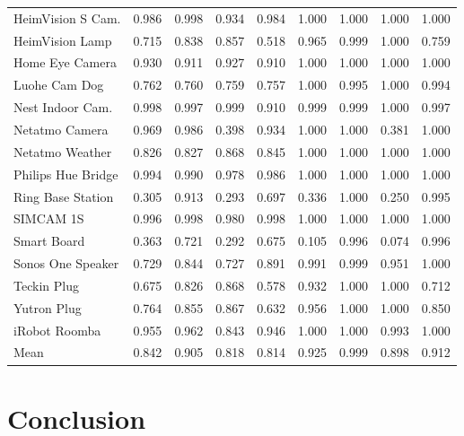 \documentclass[journal]{IEEEtran}
\begin{document}
\begin{table}[htbp]
\begin{tabular}{@{}lrrrrrrrr@{}}
		HeimVision S Cam. & 0.986 & 0.998 & 0.934 & 0.984 & 1.000 & 1.000 & 1.000 & 1.000 \\
		HeimVision Lamp & 0.715 & 0.838 & 0.857 & 0.518 & 0.965 & 0.999 & 1.000 & 0.759 \\
		Home Eye Camera & 0.930 & 0.911 & 0.927 & 0.910 & 1.000 & 1.000 & 1.000 & 1.000 \\
		Luohe Cam Dog & 0.762 & 0.760 & 0.759 & 0.757 & 1.000 & 0.995 & 1.000 & 0.994 \\
		Nest Indoor Cam. & 0.998 & 0.997 & 0.999 & 0.910 & 0.999 & 0.999 & 1.000 & 0.997 \\
		Netatmo Camera & 0.969 & 0.986 & 0.398 & 0.934 & 1.000 & 1.000 & 0.381 & 1.000 \\
		Netatmo Weather & 0.826 & 0.827 & 0.868 & 0.845 & 1.000 & 1.000 & 1.000 & 1.000 \\
		Philips Hue Bridge & 0.994 & 0.990 & 0.978 & 0.986 & 1.000 & 1.000 & 1.000 & 1.000 \\
		Ring Base Station & 0.305 & 0.913 & 0.293 & 0.697 & 0.336 & 1.000 & 0.250 & 0.995 \\
		SIMCAM 1S & 0.996 & 0.998 & 0.980 & 0.998 & 1.000 & 1.000 & 1.000 & 1.000 \\
		Smart Board & 0.363 & 0.721 & 0.292 & 0.675 & 0.105 & 0.996 & 0.074 & 0.996 \\
		Sonos One Speaker & 0.729 & 0.844 & 0.727 & 0.891 & 0.991 & 0.999 & 0.951 & 1.000 \\
		Teckin Plug & 0.675 & 0.826 & 0.868 & 0.578 & 0.932 & 1.000 & 1.000 & 0.712 \\
		Yutron Plug & 0.764 & 0.855 & 0.867 & 0.632 & 0.956 & 1.000 & 1.000 & 0.850 \\
		iRobot Roomba & 0.955 & 0.962 & 0.843 & 0.946 & 1.000 & 1.000 & 0.993 & 1.000 \\
		\midrule
		Mean  & 0.842 & 0.905 & 0.818 & 0.814 & 0.925 & 0.999 & 0.898 & 0.912 \\
		\bottomrule
	\end{tabular}%
	\label{tab:addlabel}%
\end{table}%



\section{Conclusion}







\onecolumn
\vspace{-6cm}
\appendix \label{Appendices}
\end{document}
